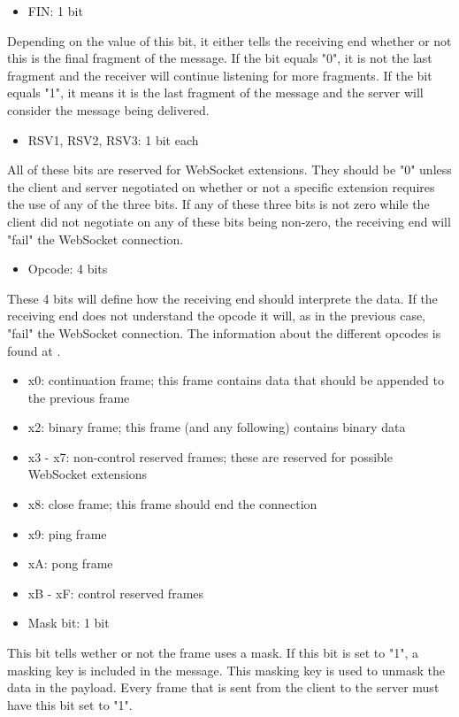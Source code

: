 \documentclass[a4paper, 11pt]{report}
\begin{document}
	\begin{itemize}
		\item {FIN: 1 bit}
	\end{itemize}
Depending on the value of this bit, it either tells the receiving end whether or not this is the final fragment of the message. If the bit equals "0", it is not the last fragment and the receiver will continue listening for more fragments. If the bit equals "1", it means it is the last fragment of the message and the server will consider the message being delivered.
	\begin{itemize}
		\item {RSV1, RSV2, RSV3:  1 bit each}
	\end{itemize}
All of these bits are reserved for WebSocket extensions. They should be "0" unless the client and server negotiated on whether or not a specific extension requires the use of any of the three bits. If any of these three bits is not zero while the client did not negotiate on any of these bits being non-zero, the receiving end will "fail" the WebSocket connection.
	\begin{itemize}
		\item {Opcode:  4 bits}
	\end{itemize}
These 4 bits will define how the receiving end should interprete the data. If the receiving end does not understand the opcode it will, as in the previous case, "fail" the WebSocket connection. The information about the different opcodes is found at \cite{opcode}.
	\begin{itemize}
		\item[] {x0: continuation frame; this frame contains data that should be appended to the previous frame}
		\item[] {x2: binary frame; this frame (and any following) contains binary data}
		\item[] {x3 - x7: non-control reserved frames; these are reserved for possible WebSocket extensions}
		\item[] {x8: close frame; this frame should end the connection}
		\item[] {x9: ping frame}
		\item[] {xA: pong frame}
		\item[] {xB - xF: control reserved frames}
	\end{itemize}
	\begin{itemize}
		\item {Mask bit: 1 bit}
	\end{itemize}
This bit tells wether or not the frame uses a mask. If this bit is set to "1", a masking key is included in the message.  This masking key is used to unmask the data in the payload. Every frame that is sent from the client to the server must have this bit set to "1".
\end{document}

